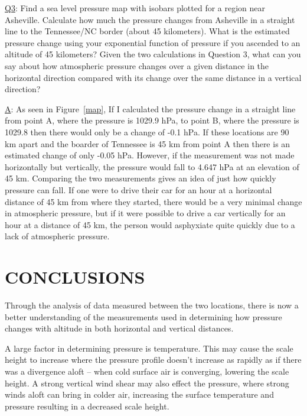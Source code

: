 \documentclass[twocolumn]{article}
\begin{document}
\underline{Q3}: Find a sea level pressure map with isobars plotted for a region near Asheville. Calculate how much the pressure changes from Asheville in a straight line to the Tennessee/NC border (about 45 kilometers). What is the estimated pressure change using your exponential function of pressure if you ascended to an altitude of 45 kilometers? Given the two calculations in Question 3, what can you say about how atmospheric pressure changes over a given distance in the horizontal direction compared with its change over the same distance in a vertical direction?

\underline{A}: As seen in Figure~\ref{map}, If I calculated the pressure change in a straight line from point A, where the pressure is 1029.9 hPa, to point B, where the pressure is 1029.8 then there would only be a change of -0.1 hPa. If these locations are 90 km apart and the boarder of Tennessee is 45 km from point A then there is an estimated change of only -0.05 hPa. However, if the measurement was not made horizontally but vertically, the pressure would fall to 4.647 hPa at an elevation of 45 km. Comparing the two measurements gives an idea of just how quickly pressure can fall. If one were to drive their car for an hour at a horizontal distance of 45 km from where they started, there would be a very minimal change in atmospheric pressure, but if it were possible to drive a car vertically for an hour at a distance of 45 km, the person would asphyxiate quite quickly due to a lack of atmospheric pressure. 


\section{{\normalsize \hspace{-0.195in} {\textbf{
CONCLUSIONS
}}}} \vspace{-1.6mm}
\label{etacomp_conc.sec}

Through the analysis of data measured between the two locations, there is now a better understanding of the measurements used in determining how pressure changes with altitude in both horizontal and vertical distances. 

A large factor in determining pressure is temperature. This may cause the scale height to increase where the pressure profile doesn’t increase as rapidly as if there was a divergence aloft – when cold surface air is converging, lowering the scale height. A strong vertical wind shear may also effect the pressure, where strong winds aloft can bring in colder air, increasing the surface temperature and pressure resulting in a decreased scale height.
\end{document}
